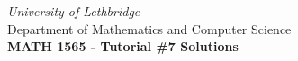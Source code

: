 \documentclass[12pt]{article}
\newcommand{\skipline}{\vspace{12pt}}
\begin{document}
\author{Instructor: Sean Fitzpatrick}
\thispagestyle{empty}

\begin{center}
\emph{University of Lethbridge}\\
Department of Mathematics and Computer Science\\
{\bf MATH 1565 - Tutorial \#7 Solutions}\\
\end{center}
\end{document}
